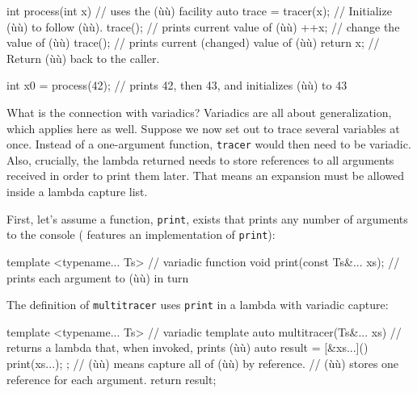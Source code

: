 \begin{emcppslisting}
int process(int x)           // uses the (ù{}ù) facility
{
    auto trace = tracer(x);  // Initialize (ù{}ù) to follow (ù{}ù).
    trace();                 // prints current value of (ù{}ù)
    ++x;                     // change the value of (ù{}ù)
    trace();                 // prints current (changed) value of (ù{}ù)
    return x;                // Return (ù{}ù) back to the caller.
}

int x0 = process(42);         // prints 42, then 43, and initializes (ù{}ù) to 43
\end{emcppslisting}
    

\noindent What is the connection with variadics? Variadics are all about
generalization, which applies here as well. Suppose we now set out to
trace several variables at once. Instead of a one-argument function,
\lstinline!tracer! would then need to be variadic. Also, crucially, the
lambda returned needs to store references to all arguments received in
order to print them later. That means an expansion must be allowed
inside a lambda capture list.

First, let's assume a function, \lstinline!print!, exists that prints any
number of arguments to the console ( features an implementation of \lstinline!print!):

\begin{emcppslisting}
template <typename... Ts>     // variadic function
void print(const Ts&... xs);  // prints each argument to (ù{}ù) in turn
\end{emcppslisting}
    

\noindent The definition of \lstinline!multitracer! uses \lstinline!print! in a lambda
with variadic capture:

\begin{emcppslisting}
template <typename... Ts>    // variadic template
auto multitracer(Ts&... xs)  // returns a lambda that, when invoked, prints (ù{}ù)
{
    auto result = [&xs...]() { print(xs...); };
        // (ù{\codeincomments{[\&xs...]}}ù) means capture all of (ù{}ù) by reference.
        // (ù{}ù) stores one reference for each argument.
    return result;
}
\end{emcppslisting}
    

